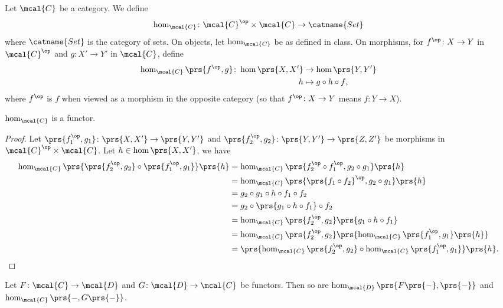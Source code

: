\documentclass[10pt]{article}
\begin{document}
\begin{solution}
\begin{definition}
Let $\mcal{C}$ be a category. We define
\[\hom_{\mcal{C}} \colon \mcal{C}^\op \times \mcal{C} \to \catname{Set}\]
where $\catname{Set}$ is the category of sets.
On objects, let $\hom_{\mcal{C}}$ be as defined in class.
On morphisms, for $f^\op \colon X \to Y$ in $\mcal{C}^\op$ and $g \colon X' \to Y'$ in $\mcal{C}$, define
\begin{align*}
\hom_{\mcal{C}}\prs{f^\op,g} \colon \hom\prs{X, X'} &\to \hom\prs{Y,Y'} \\
h &\mapsto g \circ h \circ f \text{,}
\end{align*}
where $f^\op$ is $f$ when viewed as a morphism in the opposite category (so that $f^\op \colon X \to Y$ means $f \colon Y \to X$).
\end{definition}

\begin{lemma}\label{lemma:hom_functor}
$\hom_{\mcal{C}}$ is a functor.
\end{lemma}

\begin{proof}
Let $\prs{f_1^\op, g_1} \colon \prs{X,X'} \to \prs{Y,Y'}$ and $\prs{f_2^\op, g_2} \colon \prs{Y,Y'} \to \prs{Z,Z'}$ be morphisms in $\mcal{C}^\op \times \mcal{C}$.
Let $h \in \hom\prs{X,X'}$, we have
\begin{align*}
\hom_{\mcal{C}}\prs{\prs{f_2^\op, g_2} \circ \prs{f_1^\op, g_1}}\prs{h}
&=
\hom_{\mcal{C}}\prs{f_2^\op \circ f_1^\op, g_2 \circ g_1}\prs{h}
\\&=
\hom_{\mcal{C}}\prs{\prs{f_1 \circ f_2}^\op, g_2 \circ g_1}\prs{h}
\\&= g_2 \circ g_1 \circ h \circ f_1 \circ f_2
\\&= g_2 \circ \prs{g_1 \circ h \circ f_1} \circ f_2
\\&= \hom_{\mcal{C}}\prs{f_2^\op, g_2}\prs{g_1 \circ h \circ f_1}
\\&= \hom_{\mcal{C}}\prs{f_2^\op, g_2}\prs{\hom_{\mcal{C}}\prs{f_1^\op, g_1}\prs{h}}
\\&= \prs{\hom_{\mcal{C}}\prs{f_2^\op, g_2} \circ \hom_{\mcal{C}}\prs{f_1^\op, g_1}}\prs{h} \text{.}
\end{align*}
\end{proof}

\begin{lemma}\label{lemma:hom_functor2}
Let $F \colon \mcal{C} \to \mcal{D}$ and $G \colon \mcal{D} \to \mcal{C}$ be functors. Then so are $\hom_{\mcal{D}}\prs{F\prs{-}, \prs{-}}$ and $\hom_{\mcal{C}}\prs{-,G\prs{-}}$.
\end{lemma}


\end{solution}
\end{document}
